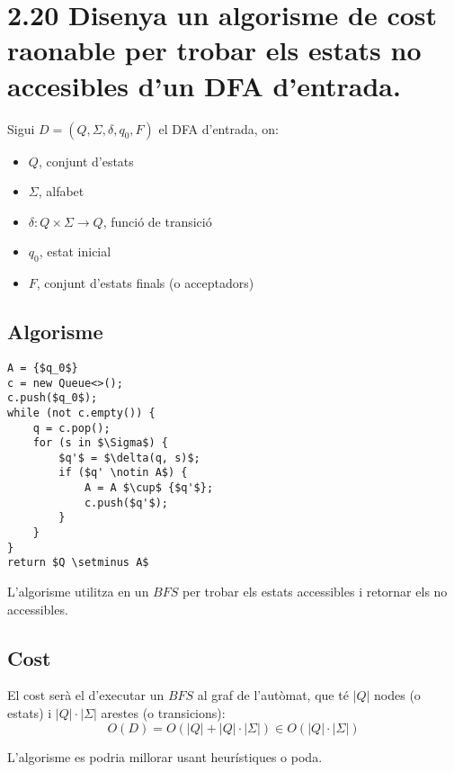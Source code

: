 \documentclass{article}
\begin{document}
\section*{\small 2.20 Disenya un algorisme de cost raonable per trobar els
estats no accesibles d'un DFA d'entrada.}

Sigui $D = (Q, \Sigma, \delta, q_0, F )$ el DFA d'entrada, on:
\begin{itemize}
    \item $Q$, conjunt d'estats
    \item $\Sigma$, alfabet
    \item $\delta : Q \times \Sigma \to Q$, funció de transició
    \item $q_0$, estat inicial
    \item $F$, conjunt d'estats finals (o acceptadors)
\end{itemize}

\subsection*{\small Algorisme}
\begin{lstlisting}[style=pseudocode] % Hem eliminat 'caption=Algorisme per trobar estats no accessibles'
A = {$q_0$}
c = new Queue<>();
c.push($q_0$);
while (not c.empty()) {
    q = c.pop();
    for (s in $\Sigma$) {
        $q'$ = $\delta(q, s)$;
        if ($q' \notin A$) {
            A = A $\cup$ {$q'$};
            c.push($q'$);
        }
    }
}
return $Q \setminus A$
\end{lstlisting}

L'algorisme utilitza en un $BFS$ per trobar els estats accessibles i retornar els no accessibles.

\subsection*{\small Cost}

El cost serà el d'executar un $BFS$ al graf de l'autòmat, que té $|Q|$ nodes (o estats) i $|Q| \cdot |\Sigma|$ arestes (o transicions):
\[
O(D) = O(|Q| + |Q| \cdot |\Sigma|) \in O(|Q| \cdot |\Sigma|)
\]
\:
\begin{tcolorbox}
L'algorisme es podria millorar usant heurístiques o poda.
\end{tcolorbox}
\end{document}
